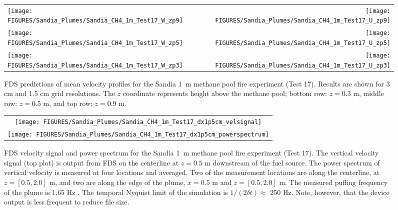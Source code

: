\begin{figure}[p]
\begin{tabular*}{\textwidth}{l@{\extracolsep{\fill}}r}
\texttt{[image: FIGURES/Sandia\_Plumes/Sandia\_CH4\_1m\_Test17\_W\_zp9]} &
\texttt{[image: FIGURES/Sandia\_Plumes/Sandia\_CH4\_1m\_Test17\_U\_zp9]} \\
\texttt{[image: FIGURES/Sandia\_Plumes/Sandia\_CH4\_1m\_Test17\_W\_zp5]} &
\texttt{[image: FIGURES/Sandia\_Plumes/Sandia\_CH4\_1m\_Test17\_U\_zp5]} \\
\texttt{[image: FIGURES/Sandia\_Plumes/Sandia\_CH4\_1m\_Test17\_W\_zp3]} &
\texttt{[image: FIGURES/Sandia\_Plumes/Sandia\_CH4\_1m\_Test17\_U\_zp3]}
\end{tabular*}
\caption[Sandia 1~m methane pool fire (Test 17) mean velocity profiles.]
{FDS predictions of mean velocity profiles for the Sandia 1~m methane pool fire experiment (Test 17). Results are shown for 3 cm and 1.5 cm grid resolutions. The $z$ coordinate represents height above the methane pool; bottom row: $z=0.3$ m, middle row: $z=0.5$ m, and top row: $z=0.9$ m.}
\label{Sandia_CH4_1m_Test17_velocity}
\end{figure}

\begin{figure}[p]
\begin{center}
\begin{tabular}{c}
\texttt{[image: FIGURES/Sandia\_Plumes/Sandia\_CH4\_1m\_Test17\_dx1p5cm\_velsignal]} \\
\texttt{[image: FIGURES/Sandia\_Plumes/Sandia\_CH4\_1m\_Test17\_dx1p5cm\_powerspectrum]}
\end{tabular}
\end{center}
\caption[Sandia 1~m methane pool fire velocity signal and power spectrum.]
{FDS velocity signal and power spectrum for the Sandia 1~m methane pool fire experiment (Test 17).  The vertical velocity signal (top plot) is output from FDS on the centerline at $z=0.5$ m downstream of the fuel source.  The power spectrum of vertical velocity is measured at four locations and averaged.  Two of the measurement locations are along the centerline, at $z=[0.5, 2.0]$ m, and two are along the edge of the plume, $x = 0.5$ m and $z=[0.5, 2.0]$ m.  The measured puffing frequency of the plume is 1.65 Hz \cite{Tieszen:2002}.  The temporal Nyquist limit of the simulation is $1/(2\delta t) \approx$ 250 Hz.  Note, however, that the device output is less frequent to reduce file size.}
\label{Sandia_CH4_1m_Test17_spectrum}
\end{figure}


